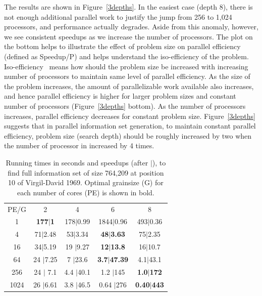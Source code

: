 \documentclass[10pt, conference, compsocconf]{IEEEtran}
\begin{document}
The results are shown in Figure~\ref{3depths}.  In the easiest case (depth 8),
there is not enough additional parallel work to justify the jump from 256 to
1,024 processors, and performance actually degrades.  Aside from this anomaly,
however, we see consistent speedups as we increase the number of processors. 
The plot on the bottom helps to illustrate the effect of problem size on parallel efficiency (defined as Speedup/P) and helps understand the iso-efficiency of the problem. Iso-efficiency~\cite{b:grama-isoefficiency} means how should the problem size be increased with increasing number of processors to maintain same level of parallel efficiency. As the size of the problem increases, the amount of parallelizable work available also increases, and hence parallel efficiency is higher for larger problem sizes and constant number of processors (Figure~\ref{3depths} bottom). As the number of processors increases, parallel efficiency decreases for constant problem size. Figure~\ref{3depths} suggests that in parallel information set generation, to maintain constant parallel efficiency, problem size (search depth) should be roughly increased by two when the number of processor in increased by 4 times.

\begin{table}[ht]
\caption{Running times in seconds and speedups (after $|$), to find full
information set of size 764,209 at position 10 of Virgil-David 1969. Optimal
grainsize (G) for each number of cores (PE) is shown in bold.}


\centering
\begin{tabular}{ccccc}
PE/G & 2 & 4 & 6 & 8 \\
1 & {\bf 177$|$1} & 178$|$0.99 & 1844$|$0.96 & 493$|$0.36 \\
4 & 71$|$2.48 & 53$|$3.34 & {\bf 48$|$3.63} & 75$|$2.35 \\
16 & 34$|$5.19 & 19 $|$9.27& {\bf 12$|$13.8} & 16$|$10.7 \\
64 & 24 $|$7.25 & 7 $|$23.6& {\bf 3.7$|$47.39} & 4.1$|$43.1 \\
256 & 24 $|$ 7.1& 4.4 $|$40.1 & 1.2 $|$145& {\bf 1.0$|$172} \\
1024 & 26 $|$6.61 & 3.8 $|$46.5& 0.64 $|$276& {\bf 0.40$|$443}
\end{tabular}

\label{tab:prob4}
\vspace{-0.1in}
\end{table}
\end{document}
